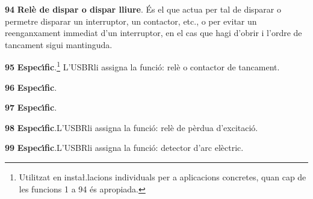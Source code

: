 \begin{multicols}{2}
\begin{list}{}
\item[\textbf{94}]  \textbf{Rel\`{e} de dispar o dispar
lliure}. \'{E}s el que actua per tal de disparar o permetre disparar un
interruptor, un contactor, etc., o per evitar un reenganxament
immediat d'un interruptor, en el cas que hagi d'obrir i l'ordre de
tancament sigui mantinguda.

\item[\textbf{95}] \textbf{Espec\'{\i}fic}.\footnote{Utilitzat en insta{\l.l}acions
individuals per a aplicacions concretes, quan cap de les funcions 1
a 94 \'{e}s apropiada.} L'\textsf{USBR}\footnotemark[1] li assigna la
funci\'{o}: rel\`{e} o contactor de tancament.

\item[\textbf{96}] \textbf{Espec\'{\i}fic}.\footnotemark[2]

\item[\textbf{97}] \textbf{Espec\'{\i}fic}.\footnotemark[2]

\item[\textbf{98}] \textbf{Espec\'{\i}fic}.\footnotemark[2] L'\textsf{USBR}\footnotemark[1] li assigna la
funci\'{o}: rel\`{e} de p\`{e}rdua d'excitaci\'{o}.

\item[\textbf{99}] \textbf{Espec\'{\i}fic}.\footnotemark[2] L'\textsf{USBR}\footnotemark[1] li assigna la
funci\'{o}: detector d'arc el\`{e}ctric.

\end{list}
\end{multicols}
